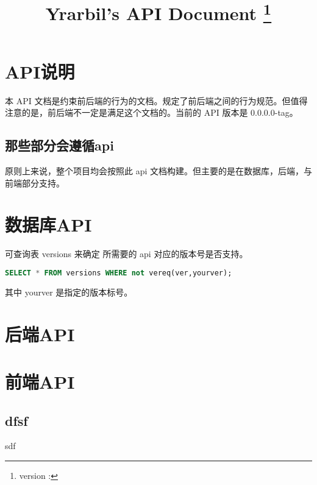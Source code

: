 \documentclass[UTF8]{ctexart}
\title{Yrarbil's API Document \thanks{version : \apiver}}
\def\apiver{0.0.0.0-tag}
\begin{document}
    \maketitle
    \newpage
    
    \tableofcontents
    \newpage
    \section{API说明}
    本 API 文档是约束前后端的行为的文档。规定了前后端之间的行为规范。但值得注意的是，前后端不一定是满足这个文档的。当前的 API 版本是 \apiver 。
    \subsection{那些部分会遵循api}
    原则上来说，整个项目均会按照此 api 文档构建。但主要的是在数据库，后端，与前端部分支持。
    \section{数据库API}
     可查询表 versions 来确定 所需要的 api 对应的版本号是否支持。
    \begin{lstlisting}[language=SQL]
SELECT * FROM versions WHERE not vereq(ver,yourver);
    \end{lstlisting}
    其中 yourver 是指定的版本标号。
    \section{后端API}
    \section{前端API}
    \newpage
    \begin{appendices}
    \section{dfsf}
    
    sdf
    \end{appendices}
    
\end{document}
